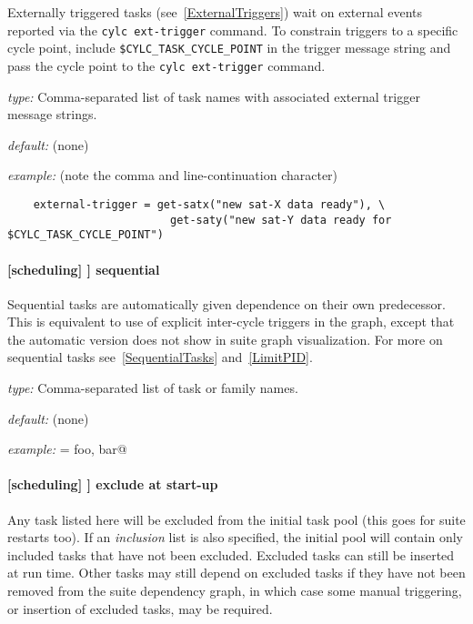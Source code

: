 Externally triggered tasks (see~\ref{ExternalTriggers}) wait on external events
reported via the \lstinline=cylc ext-trigger= command.  To constrain triggers
to a specific cycle point, include \lstinline=$CYLC_TASK_CYCLE_POINT= in the
trigger message string and pass the cycle point to the \lstinline=cylc ext-trigger= command.

\begin{myitemize}
    \item {\em type:} Comma-separated list of task names with associated
        external trigger message strings.
    \item {\em default:} (none)
    \item {\em example:} (note the comma and line-continuation character)
\begin{lstlisting}
    external-trigger = get-satx("new sat-X data ready"), \
                         get-saty("new sat-Y data ready for $CYLC_TASK_CYCLE_POINT")
\end{lstlisting}
\end{myitemize}


\paragraph[sequential]{[scheduling] \textrightarrow [[special tasks]] \textrightarrow sequential}

Sequential tasks are automatically given dependence on their own
predecessor. This is equivalent to use of explicit inter-cycle triggers
in the graph, except that the automatic version does not show in suite
graph visualization. For more on sequential tasks see~\ref{SequentialTasks}
and~\ref{LimitPID}.

\begin{myitemize}
    \item {\em type:} Comma-separated list of task or family names.
    \item {\em default:} (none)
    \item {\em example:} \lstinline@sequential = foo, bar@
\end{myitemize}

\paragraph[exclude at start-up]{[scheduling] \textrightarrow [[special tasks]] \textrightarrow exclude at start-up}
\label{EASU}

Any task listed here will be excluded from the initial task pool (this
goes for suite restarts too). If an {\em inclusion} list is also
specified, the initial pool will contain only included tasks that have
not been excluded. Excluded tasks can still be inserted at run time.
Other tasks may still depend on excluded tasks if they have not been
removed from the suite dependency graph, in which case some manual
triggering, or insertion of excluded tasks, may be required.

